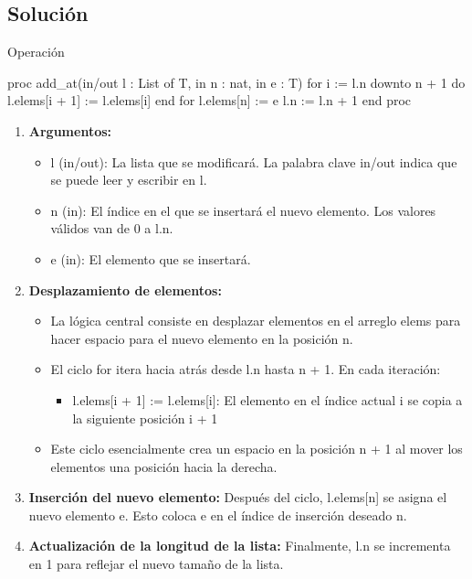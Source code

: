 \subsection{Solución}
\begin{codebox}{Operación}
\begin{pascallike}
proc add_at(in/out l : List of T, in n : nat, in e : T)
    for i := l.n downto n + 1 do
        l.elems[i + 1] := l.elems[i]
    end for
    l.elems[n] := e
    l.n := l.n + 1
end proc
\end{pascallike}
\end{codebox}

\begin{enumerate}
    \item \textbf{Argumentos:} 
    \begin{itemize}
        \item l (in/out): La lista que se modificará. La palabra clave in/out indica que se puede leer y escribir en l.
        \item n (in): El índice en el que se insertará el nuevo elemento. Los valores válidos van de 0 a l.n.
        \item e (in): El elemento que se insertará.
    \end{itemize}
    \item \textbf{Desplazamiento de elementos:}
    \begin{itemize}
        \item La lógica central consiste en desplazar elementos en el arreglo elems para hacer espacio para el nuevo elemento en la posición n.
        \item El ciclo for itera hacia atrás desde l.n hasta n + 1. En cada iteración:
        \begin{itemize}
            \item l.elems[i + 1] := l.elems[i]: El elemento en el índice actual i se copia a la siguiente posición i + 1
        \end{itemize}
        \item Este ciclo esencialmente crea un espacio en la posición n + 1 al mover los elementos una posición hacia la derecha.
    \end{itemize}
    \item \textbf{Inserción del nuevo elemento:} Después del ciclo, l.elems[n] se asigna el nuevo elemento e. Esto coloca e en el índice de inserción deseado n.
    \item \textbf{Actualización de la longitud de la lista:} Finalmente, l.n se incrementa en 1 para reflejar el nuevo tamaño de la lista.
\end{enumerate}


